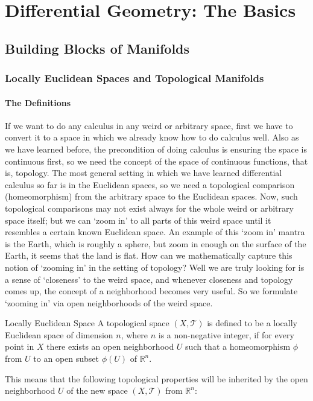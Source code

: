 \chapter{Differential Geometry: The Basics}
\section{Building Blocks of Manifolds}
\subsection{Locally Euclidean Spaces and Topological Manifolds}
\subsubsection{The Definitions}
If we want to do any calculus in any weird or arbitrary space, first we have to convert it to a space in which we already know how to do calculus well. Also as we have learned before, the precondition of doing calculus is ensuring the space is continuous first, so we need the concept of the space of continuous functions, that is, topology. The most general setting in which we have learned differential calculus so far is in the Euclidean spaces, so we need a topological comparison (homeomorphism) from the arbitrary space to the Euclidean spaces. Now, such topological comparisons may not exist always for the whole weird or arbitrary space itself; but we can `zoom in' to all parts of this weird space until it resembles a certain known Euclidean space. An example of this `zoom in' mantra is the Earth, which is roughly a sphere, but zoom in enough on the surface of the Earth, it seems that the land is flat. How can we mathematically capture this notion of `zooming in' in the setting of topology? Well we are truly looking for is a sense of `closeness' to the weird space, and whenever closeness and topology comes up, the concept of a neighborhood becomes very useful. So we formulate `zooming in' via open neighborhoods of the weird space.
\begin{Definition}{Locally Euclidean Space}\label{locally_euclidean_space}
	A topological space $(X,\mathcal{T})$ is defined to be a locally Euclidean space of dimension $n$, where $n$ is a non-negative integer, if for every point in $X$ there exists an open neighborhood $U$ such that a homeomorphism $\phi$ from $U$ to an open subset $\phi(U)$ of $\mathbb{R}^n$.
\end{Definition}
\noindent This means that the following topological properties will be inherited by the open neighborhood $U$ of the new space $(X,\mathcal{T})$ from $\mathbb{R}^n$:
